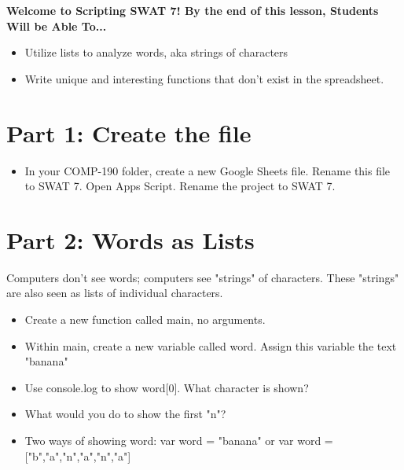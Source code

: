 \documentclass{article}
\newcommand{\AName}{Scripting SWAT 7}
\begin{document}
\textbf{Welcome to \AName!  By the end of this lesson, Students Will be Able To...}
\begin{itemize}
    \item Utilize lists to analyze words, aka strings of characters
	\item Write unique and interesting functions that don't exist in the spreadsheet.
\end{itemize}


\section*{Part 1: Create the file}
\begin{itemize}
    \item In your COMP-190 folder, create a new Google Sheets file.  Rename this file to SWAT 7.  Open Apps Script.  Rename the project to SWAT 7.
\end{itemize}

\section*{Part 2: Words as Lists}
Computers don't see words; computers see "strings" of characters.  These "strings" are also seen as lists of individual characters.
\begin{itemize}
    \item Create a new function called main, no arguments.  
    \item Within main, create a new variable called word.  Assign this variable the text "banana"
    \item Use console.log to show word[0].  What character is shown?
    \item What would you do to show the first "n"?
    \item Two ways of showing word:  var word = "banana" or var word = ["b","a","n","a","n","a"]
\end{itemize}
\end{document}

